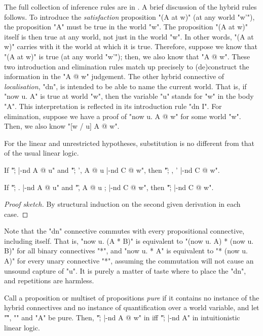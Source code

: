 \documentclass{article}
\begin{document}
The full collection of inference rules are in . A brief
discussion of the hybrid rules follows. To introduce the \emph{satisfaction}
proposition "(A at w)" (at any world "w'"), the proposition "A" must be true in the
world "w". The proposition "(A at w)" itself is then true at any world, not just
in the world "w". In other words, "(A at w)" carries with it the world at which
it is true. Therefore, suppose we know that "(A at w)" is true (at any world "w'");
then, we also know that "A @ w". These two introduction and
elimination rules match up precisely to (de)construct the information in the "A
@ w" judgement.
The other hybrid connective of \emph{localisation}, "dn", is intended to be
able to name the current world. That is, if "now u. A" is true at world "w",
then the variable "u" stands for "w" in the body "A". This interpretation is
reflected in its introduction rule "{dn} I". For elimination, suppose we have a
proof of "now u. A @ w" for some world "w". Then, we also know "[w / u] A @ w".

For the linear and unrestricted hypotheses, substitution is no different 
from that of the usual linear logic.

\begin{thm}[substitution] \label{thm:subst} \mbox{}
\begin{ecom}
  \item \label{thm:subst.1}
    If "\G ; \D |-nd A @ u" and "\G ; \D', A @ u |-nd C @ w", then "\G ; \D, \D' |-nd C @ w".
  \item  \label{thm:subst.2}
    If "\G ; . |-nd A @ u" and "\G, A @ u ; \D |-nd C @ w", then "\G ; \D |-nd C @ w".
  \end{ecom}
\end{thm}

\begin{proof}[Proof sketch]
  By structural induction on the second given derivation in each case.
\end{proof}

Note that the "dn" connective commutes with every propositional connective, including itself. That
is, "now u. (A * B)" is equivalent to "(now u. A) * (now u. B)" for all binary connectives "*", and
"now u. * A" is equivalent to "* (now u. A)" for every unary connective "*", assuming the
commutation will not cause an unsound capture of "u". It is purely a matter of taste where to place
the "dn", and repetitions are harmless.

\begin{thm}[conservativity]
  \label{thm:conserv}
  Call a proposition or multiset of propositions \emph{pure} if it contains no
  instance of the hybrid connectives and no instance of quantification over a world variable, 
  and let "\G", "\D" and "A" be pure. 
  Then, "\G ; \D |-nd A @ w" in \hyll iff "\G ; \D |-nd A" in intuitionistic linear logic.
\end{thm}
\end{document}
